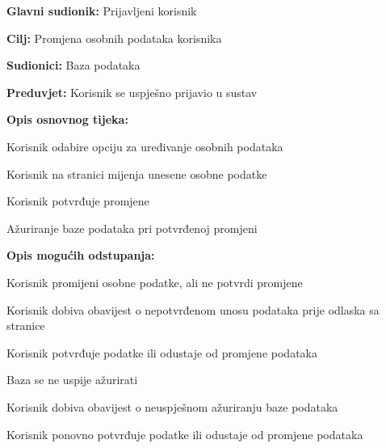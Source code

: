 					\noindent {}
					\begin{packed_item}
	
						\item \textbf{Glavni sudionik: }Prijavljeni korisnik
						\item  \textbf{Cilj:} Promjena osobnih podataka korisnika
						\item  \textbf{Sudionici:} Baza podataka
						\item  \textbf{Preduvjet:} Korisnik se uspješno prijavio u sustav
						\item  \textbf{Opis osnovnog tijeka:}
						
						\item[] \begin{packed_enum}
							\item Korisnik odabire opciju za uređivanje osobnih podataka
							\item Korisnik na stranici mijenja unesene osobne podatke
							\item Korisnik potvrđuje promjene
							\item Ažuriranje baze podataka pri potvrđenoj promjeni
						\end{packed_enum}

						\item  \textbf{Opis mogućih odstupanja:}

						\item[] \begin{packed_item}
							\item[2.a] Korisnik promijeni osobne podatke, ali ne potvrdi promjene
							\item[] \begin{packed_enum}
								
								\item Korisnik dobiva obavijest o nepotvrđenom unosu podataka prije \newline odlaska sa stranice
								\item Korisnik potvrđuje podatke ili odustaje od promjene podataka
							
							\end{packed_enum}	
							\item[4.a] Baza se ne uspije ažurirati
							\item[] \begin{packed_enum}
							
								\item Korisnik dobiva obavijest o neuspješnom ažuriranju baze podataka
								\item Korisnik ponovno potvrđuje podatke ili odustaje od promjene \newline podataka
							\end{packed_enum}
						\end{packed_item}
						
					\end{packed_item}

